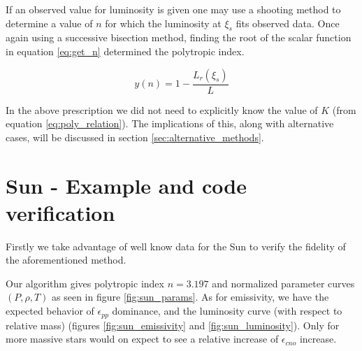 \documentclass{aa}
\begin{document}
If an observed value for luminosity is given one may use a shooting method to
determine a value of $n$ for which the luminosity at $\xi_s$ fits observed data.
Once again using a successive bisection method, finding the root of the scalar
function in equation \ref{eq:get_n} determined the polytropic index.

\begin{equation}
  \label{eq:get_n}
  y(n) = 1 - \frac{L_r(\xi_s)}{L}
\end{equation}

In the above prescription we did not need to explicitly know the value of $K$
(from equation \ref{eq:poly_relation}). The implications of this, along with
alternative cases, will be discussed in section \ref{sec:alternative_methods}.

\section{Sun - Example and code verification}
\label{sec:code_verification}

Firstly we take advantage of well know data for the Sun to verify the fidelity of the aforementioned method.

Our algorithm gives polytropic index $n = 3.197$ and normalized parameter
curves $(P, \rho, T)$ as seen in figure \ref{fig:sun_params}. As for emissivity,
we have the expected behavior of $\epsilon_{pp}$ dominance, and the
luminosity curve (with respect to relative mass) (figures
\ref{fig:sun_emissivity} and \ref{fig:sun_luminosity}). Only for more massive
stars would on expect to see a relative increase of $\epsilon_{cno}$ increase.
\end{document}
